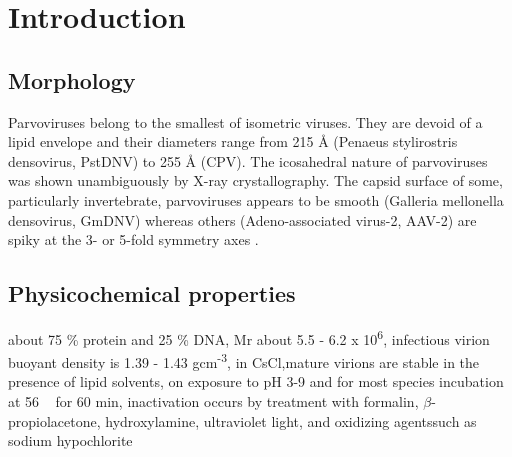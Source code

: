 
\chapter{Introduction} %

\label{Chapter1} %


\section{Morphology}

Parvoviruses belong to the smallest of isometric viruses. They are devoid of a lipid envelope and their diameters range from 215 \r{A} (Penaeus stylirostris densovirus, PstDNV) to 255 \r{A} (CPV). The icosahedral nature of parvoviruses was shown unambiguously by X-ray crystallography. The capsid surface of some, particularly invertebrate, parvoviruses appears to be smooth (Galleria mellonella densovirus, GmDNV) whereas others (Adeno-associated virus-2, AAV-2) are spiky at the 3- or 5-fold symmetry axes \cite{pmid10497831, icvt}.      






\section{Physicochemical properties}
about 75 \% protein and 25 \% DNA, Mr about 5.5 - 6.2 x 10\textsuperscript{6}, infectious virion buoyant density is 1.39 - 1.43 gcm\textsuperscript{-3}, in CsCl,mature virions are stable in the presence of lipid solvents, on exposure to pH 3-9 and for most species incubation at 56 \textcelsius~ for 60 min, inactivation occurs by treatment with formalin, $\beta$-propiolacetone, hydroxylamine, ultraviolet light, and oxidizing agentssuch as sodium hypochlorite    

